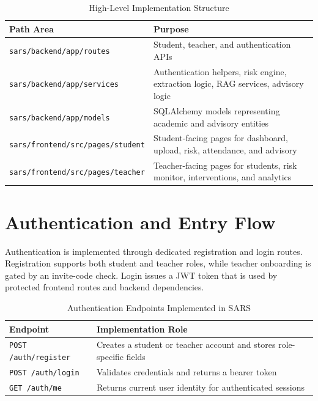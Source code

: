 \begin{table}[H]
\centering
\caption{High-Level Implementation Structure}
\begin{tabularx}{\textwidth}{>{\raggedright\arraybackslash}p{} >{\raggedright\arraybackslash}X}
\toprule
\textbf{Path Area} & \textbf{Purpose} \\
\midrule
\texttt{sars/backend/app/routes} & Student, teacher, and authentication APIs \\
\texttt{sars/backend/app/services} & Authentication helpers, risk engine, extraction logic, RAG services, advisory logic \\
\texttt{sars/backend/app/models} & SQLAlchemy models representing academic and advisory entities \\
\texttt{sars/frontend/src/pages/student} & Student-facing pages for dashboard, upload, risk, attendance, and advisory \\
\texttt{sars/frontend/src/pages/teacher} & Teacher-facing pages for students, risk monitor, interventions, and analytics \\
\bottomrule
\end{tabularx}
\end{table}

\section{Authentication and Entry Flow}
Authentication is implemented through dedicated registration and login routes. Registration supports both student and teacher roles, while teacher onboarding is gated by an invite-code check. Login issues a JWT token that is used by protected frontend routes and backend dependencies.

\begin{table}[H]
\centering
\caption{Authentication Endpoints Implemented in SARS}
\begin{tabularx}{\textwidth}{>{\raggedright\arraybackslash}p{} >{\raggedright\arraybackslash}X}
\toprule
\textbf{Endpoint} & \textbf{Implementation Role} \\
\midrule
\texttt{POST /auth/register} & Creates a student or teacher account and stores role-specific fields \\
\texttt{POST /auth/login} & Validates credentials and returns a bearer token \\
\texttt{GET /auth/me} & Returns current user identity for authenticated sessions \\
\bottomrule
\end{tabularx}
\end{table}

